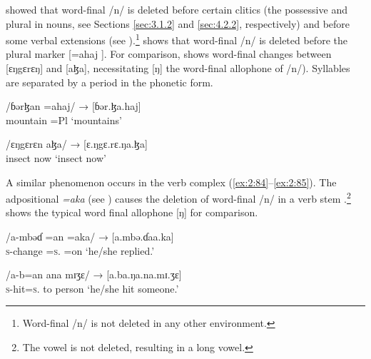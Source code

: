 \citet{Bow1997c} showed that word-final /n/ is deleted before certain clitics (the possessive and plural in nouns, see Sections \ref{sec:3.1.2} and \ref{sec:4.2.2}, respectively) and before some verbal extensions (see ).\footnote{Word-final /n/ is not deleted in any other environment. }  shows that word-final /n/ is deleted before the plural marker [=ahaj ]. For comparison,  shows word-final changes between [ɛŋgɛrɛŋ] and [aɮa], necessitating [ŋ] the word-final allophone of /n/). Syllables are separated by a period in the phonetic form.

\ea \label{ex:2:82}
\gll   /ɓərɮan =ahaj/  →  [ɓər.ɮa.haj]\\
       mountain =Pl   {} ‘mountains’\\
\z

\ea \label{ex:2:83}
\gll /ɛŋgɛrɛn    aɮa/ \hspace{11pt} → [ɛ.ŋgɛ.rɛ.ŋa.ɮa]\\
      insect     now {} {} {‘insect now’}\\
\z

A similar phenomenon occurs in the verb complex (\ref{ex:2:84}--\ref{ex:2:85}). The adpositional \textit{=aka} (see ) causes the deletion of word-final /n/ in a verb stem .\footnote{The vowel is not deleted, resulting in a long vowel. }  shows the typical word final allophone [ŋ] for comparison. 

\ea \label{ex:2:84}
\gll /a-mbəɗ                           =an                               =aka/   →   [a.mbə.ɗaa.ka]\\
     \textsc{s}-change =\textsc{s}.{\IO} =on     {}  {‘he/she replied.’}\\
\z

\ea \label{ex:2:85}
\gll /a-b=an        ana  mɪʒɛ/       →   [a.ba.ŋa.na.mɪ.ʒɛ]\\
     \textsc{s}-hit=\textsc{s}.{\IO}  to    person {} {‘he/she hit someone.’}\\
\z


